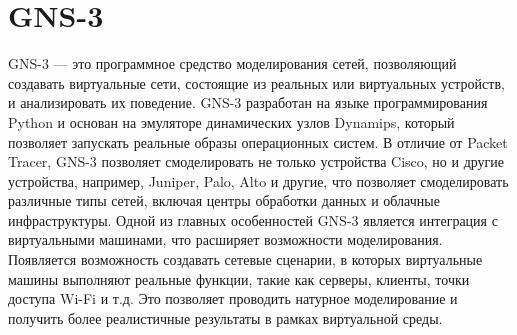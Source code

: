 \section{GNS-3}

GNS-3 — это программное средство моделирования сетей, позволяющий
создавать виртуальные сети, состоящие из реальных или виртуальных
устройств, и анализировать их поведение. GNS-3 разработан на языке
программирования Python и основан на эмуляторе динамических узлов
Dynamips, который позволяет запускать реальные образы операционных
систем. В отличие от Packet Tracer, GNS-3 позволяет смоделировать не
только устройства Cisco, но и другие устройства, например, Juniper,
Palo, Alto и другие, что позволяет смоделировать различные типы сетей,
включая центры обработки данных и облачные инфраструктуры. Одной из
главных особенностей GNS-3 является интеграция с виртуальными
машинами, что расширяет возможности моделирования. Появляется
возможность создавать сетевые сценарии, в которых виртуальные машины
выполняют реальные функции, такие как серверы, клиенты, точки доступа
Wi-Fi и т.д. Это позволяет проводить натурное моделирование и
получить более реалистичные результаты в рамках виртуальной среды.





